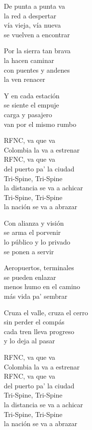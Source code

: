 \begin{lyrics}
De punta a punta va\\
la red a despertar\\
vía vieja, vía nueva\\
se vuelven a encontrar

Por la sierra tan brava\\
la hacen caminar\\
con puentes y andenes\\
la ven renacer

Y en cada estación\\
se siente el empuje\\
carga y pasajero\\
van por el mismo rumbo

RFNC, va que va\\
Colombia la va a estrenar\\
RFNC, va que va\\
del puerto pa’ la ciudad\\
Tri-Spine, Tri-Spine\\
la distancia se va a achicar\\
Tri-Spine, Tri-Spine\\
la nación se va a abrazar

Con alianza y visión\\
se arma el porvenir\\
lo público y lo privado\\
se ponen a servir

Aeropuertos, terminales\\
se pueden enlazar\\
menos humo en el camino\\
más vida pa’ sembrar

Cruza el valle, cruza el cerro\\
sin perder el compás\\
cada tren lleva progreso\\
y lo deja al pasar

RFNC, va que va\\
Colombia la va a estrenar\\
RFNC, va que va\\
del puerto pa’ la ciudad\\
Tri-Spine, Tri-Spine\\
la distancia se va a achicar\\
Tri-Spine, Tri-Spine\\
la nación se va a abrazar


\end{lyrics}

